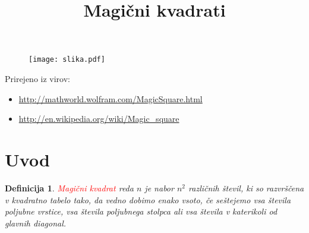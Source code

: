 \documentclass[a4paper,12pt]{article}
\title{Magični kvadrati}
\date{}
\newtheorem{definition}{Definicija}
\newcommand{\pojem}[1]{\emph{#1}}
\begin{document}
\maketitle

\begin{figure}[!ht]
   \centering
   \texttt{[image: slika.pdf]}
   \label{fig: slika1}
\end{figure}
Prirejeno iz virov:

\begin{itemize}
   \item \url{http://mathworld.wolfram.com/MagicSquare.html}
   \item \url{http://en.wikipedia.org/wiki/Magic_square}
\end{itemize}

\tableofcontents

\newpage

\section{Uvod}

\begin{definition}
   \textcolor{red}{\pojem{Magični kvadrat}} reda $n$ je nabor $n^2$ različnih števil,
   ki so razvrščena v kvadratno tabelo tako, da vedno dobimo enako vsoto,
   če seštejemo vsa števila poljubne vrstice, vsa števila poljubnega
   stolpca ali vsa števila v katerikoli od glavnih diagonal.
\end{definition}
\end{document}
